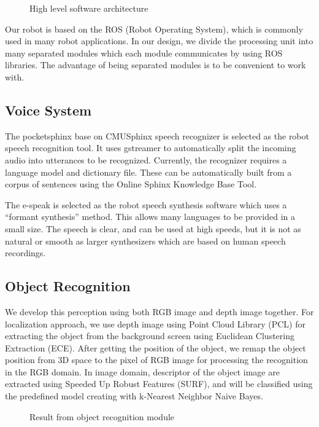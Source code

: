\documentclass{llncs}
\newcommand{\dq}[1]{``#1''}
\begin{document}
\begin{figure}
\centering
\caption{High level software architecture}
\label{fig:soft_arc}
\end{figure}

Our robot is based on the ROS (Robot Operating System), which is commonly used in many robot applications. In our design, we divide the processing unit into many separated modules which each module communicates by using ROS libraries. The advantage of being separated modules is to be convenient to work with.

\subsection{Voice System}

The pocketsphinx base on CMUSphinx speech recognizer is selected as the robot speech recognition tool. It uses gstreamer to automatically split the incoming audio into utterances to be recognized. Currently, the recognizer requires a language model and dictionary file. These can be automatically built from a corpus of sentences using the Online Sphinx Knowledge Base Tool.

The e-speak is selected as the robot speech synthesis software which uses a \dq{formant synthesis} method. This allows many languages to be provided in a small size. The speech is clear, and can be used at high speeds, but it is not as natural or smooth as larger synthesizers which are based on human speech recordings.

\subsection{Object Recognition}

We develop this perception using both RGB image and depth image together. For localization approach, we use depth image using Point Cloud Library (PCL) for extracting the object from the background screen using Euclidean Clustering Extraction (ECE). After getting the position of the object, we remap the object position from 3D space to the pixel of RGB image for processing the recognition in the RGB domain. In image domain, descriptor of the object image are extracted using Speeded Up Robust Features (SURF), and will be classified using the predefined model creating with k-Nearest Neighbor Naive Bayes.

\begin{figure}
\centering
\caption{Result from object recognition module}
\label{fig:object_recog}
\end{figure}
\end{document}
